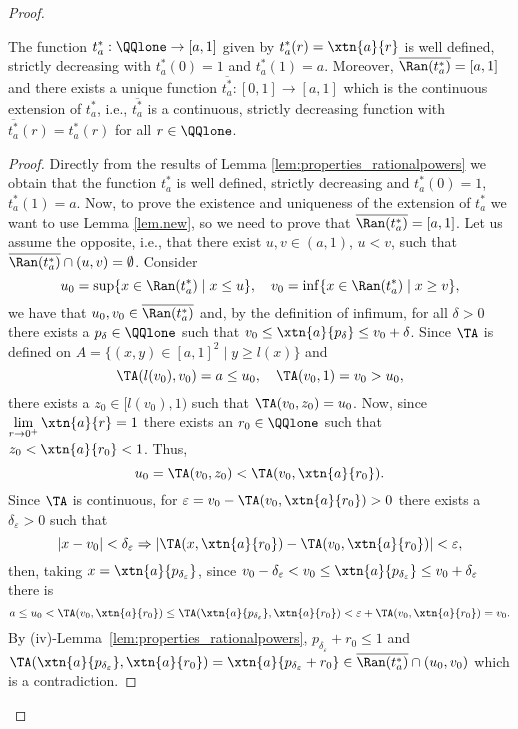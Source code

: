 \begin{proof}
	\begin{sublemma}\label{sublem:extension} The function $ t^*_a : \QQlone \to [a,1]$ given by $t^*_a(r)=\xtn{a}{r}$ is well defined, strictly decreasing with $t^*_a(0)=1$ and $t^*_a(1)=a$. Moreover, $\overline{\Ran (t^*_a)} = [a,1]$ and there exists a unique function $ \overline{t^*_a} : [0,1] \to [a,1]$  which is the continuous extension of $t^*_a$, i.e., $ \overline{t^*_a}$ is a continuous, strictly decreasing function with $\overline{t^*_a}(r)= t^*_a(r)$ for all $r \in \QQlone$.
	\end{sublemma}
	\begin{proof}
		Directly from the results of Lemma \ref{lem:properties_rationalpowers} we obtain that the function $t_a^*$ is well defined, strictly decreasing and $t_a^*(0)=1$, $t_a^*(1)=a$.
		Now, to prove the existence and uniqueness of the extension of $t_a^*$ we want to use Lemma \ref{lem.new}, so we need to prove that $\overline{\Ran (t^*_a)} = [a,1]$. Let us assume the opposite, i.e., that there exist $u,v \in (a,1)$, $u<v$, such that $ \overline{\Ran (t^*_a)} \cap (u,v)=\emptyset$. Consider
		$$u_0 = \sup \{x \in \Ran (t^*_a) \mid x \leq u\}, \quad v_0 = \inf \{x \in \Ran (t^*_a) \mid x \geq v\},$$
		we have that $u_0,v_0 \in \overline{\Ran (t^*_a)}$ and, by the definition of infimum, for all $\delta >0$ there exists a $p_{\delta} \in \QQlone$ such that $v_0 \leq \xtn{a}{p_{\delta}} \leq v_0 + \delta$. Since $\TA$ is defined on $A=\{(x,y) \in [a,1]^2 \mid y \geq l(x)\}$ and
		$$\TA(l(v_0),v_0)=a \leq u_0 , \quad \TA(v_0,1)=v_0 > u_0,$$
		there exists a $z_0 \in [l(v_0),1)$ such that $\TA(v_0,z_0)=u_0$. Now, since $\displaystyle \lim_{r \to 0^+} \xtn{a}{r}=1$ there exists an $r_0 \in \QQlone$ such that $z_0 < \xtn{a}{r_0} < 1$. Thus,
		$$ u_0 = \TA(v_0,z_0) < \TA(v_0,\xtn{a}{r_0}).$$
		Since $\TA$ is continuous, for $\varepsilon = v_0 - \TA(v_0,\xtn{a}{r_0})>0$ there exists a $\delta_{\varepsilon}>0$ such that
		$$| x- v_0 | < \delta_{\varepsilon} \Rightarrow | \TA(x,\xtn{a}{r_0}) - \TA(v_0,\xtn{a}{r_0})| < \varepsilon,$$
		then, taking $x=\xtn{a}{p_{\delta_\varepsilon}}$, since $v_0-\delta_\varepsilon < v_0 \leq \xtn{a}{p_{\delta_\varepsilon}} \leq v_0 + \delta_\varepsilon$ there is
		$$a \leq u_0 < \TA(v_0,\xtn{a}{r_0}) \leq \TA(\xtn{a}{p_{\delta_\varepsilon}},\xtn{a}{r_0}) < \varepsilon +\TA(v_0,\xtn{a}{r_0})=v_0.$$
		By (iv)-Lemma~\ref{lem:properties_rationalpowers}, $p_{\delta_\varepsilon} + r_0 \leq 1$ and $\TA(\xtn{a}{p_{\delta_\varepsilon}},\xtn{a}{r_0}) = \xtn{a}{p_{\delta_{\varepsilon}}+r_0} \in \overline{\Ran (t^*_a)} \cap (u_0,v_0)$ which is a contradiction.

\end{proof}
\end{proof}

